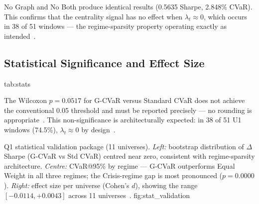 No Graph and No Both produce identical results (0.5635 Sharpe, 2.848\%
CVaR). This confirms that the centrality signal has no effect when
$\lambda_t \approx 0$, which occurs in 38 of 51 windows — the
regime-sparsity property operating exactly as intended~\citep{ang2002}.

\subsection{Statistical Significance and Effect Size}

  {tab:stats}
  {}

The Wilcoxon $p = 0.0517$ for G-CVaR versus Standard CVaR does not
achieve the conventional 0.05 threshold and must be reported precisely —
no rounding is appropriate~\citep{harvey2016}. This non-significance is
architecturally expected: in 38 of 51 U1 windows (74.5\%), $\lambda_t
\approx 0$ by design~\citep{ang2002,hamilton1989}.

  {Q1 statistical validation package (11 universes). \textit{Left:}
   bootstrap distribution of $\Delta$Sharpe (G-CVaR vs Std CVaR)
   centred near zero, consistent with regime-sparsity architecture.
   \textit{Centre:} CVaR@95\% by regime — G-CVaR outperforms Equal
   Weight in all three regimes; the Crisis-regime gap is most
   pronounced ($p = 0.0000$). \textit{Right:} effect size per
   universe (Cohen's $d$), showing the range $[-0.0114, +0.0043]$
   across 11 universes~\citep{harvey2016,cont2001}.}
  {fig:stat_validation}

